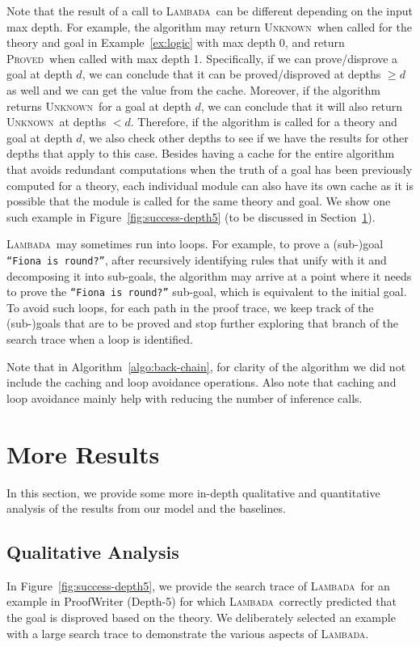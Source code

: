 \documentclass[11pt]{article}
\newcommand{\algo}{\textsc{Lambada}}
\newcommand{\proved}{\textsc{Proved}}
\newcommand{\unk}{\textsc{Unknown}}
\begin{document}
Note that the result of a call to \algo\ can be different depending on the input max depth. For example, the algorithm may return \unk\ when called for the theory and goal in Example~\ref{ex:logic} with max depth 0, and return \proved\ when called with max depth 1. Specifically, if we can prove/disprove a goal at depth $d$, we can conclude that it can be proved/disproved at depths $\geq d$ as well and we can get the value from the cache. Moreover, if the algorithm returns \unk\ for a goal at depth $d$, we can conclude that it will also return \unk\ at depths $<d$. Therefore, if the algorithm is called for a theory and goal at depth $d$, we also check other depths to see if we have the results for other depths that apply to this case. 
Besides having a cache for the entire algorithm that avoids redundant computations when the truth of a goal has been previously computed for a theory, each individual module can also have its own cache as it is possible that the module is called for the same theory and goal. We show one such example in Figure~\ref{fig:success-depth5} (to be discussed in Section~\ref{sec:more-results}).

\algo\ may sometimes run into loops. For example, to prove a (sub-)goal \texttt{``Fiona is round?''}, after recursively identifying rules that unify with it and decomposing it into sub-goals, the algorithm may arrive at a point where it needs to prove the \texttt{``Fiona is round?''} sub-goal, which is equivalent to the initial goal. To avoid such loops, for each path in the proof trace, we keep track of the (sub-)goals that are to be proved and stop further exploring that branch of the search trace when a loop is identified.

Note that in Algorithm~\ref{algo:back-chain}, for clarity of the algorithm we did not include the caching and loop avoidance operations. Also note that caching and loop avoidance mainly help with reducing the number of inference calls.

\section{More Results} \label{sec:more-results}
In this section, we provide some more in-depth qualitative and quantitative analysis of the results from our model and the baselines. 

\subsection{Qualitative Analysis}
In Figure~\ref{fig:success-depth5}, we provide the search trace of \algo\ for an example in ProofWriter (Depth-5) for which \algo\ correctly predicted that the goal is disproved based on the theory. We deliberately selected an example with a large search trace to demonstrate the various aspects of \algo.
\end{document}

